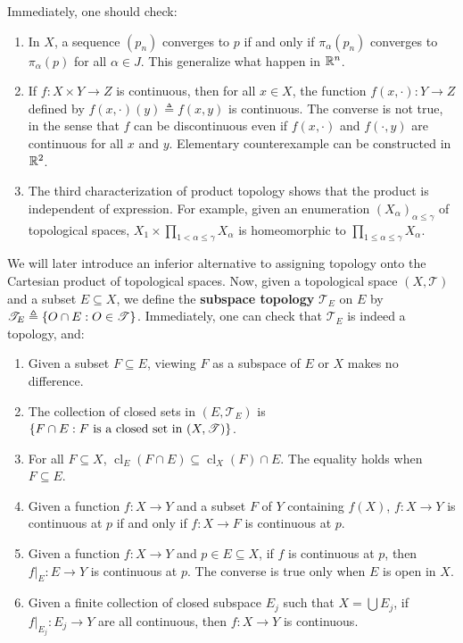 \documentclass{report}
\begin{document}
\begin{mdframed}
Immediately, one should check:
\begin{enumerate}[label=(\alph*)]
    \item In $X$, a sequence $(p_n)$ converges to $p$ if and only if $\pi_\alpha(p_n)$ converges to $\pi_\alpha(p)$ for all $\alpha \in J$. This generalize what happen in $\mathbb{R}^n$. 
    \item If $f : X \times Y \to Z$ is continuous, then for all $x \in X$, the function $f(x,\cdot) : Y \to Z$ defined by $f(x,\cdot)(y) \triangleq f(x, y)$ is continuous. The converse is not true, in the sense that $f$ can be discontinuous even if $f(x,\cdot)$ and $f(\cdot, y)$ are continuous for all $x$ and $y$. Elementary
counterexample can be constructed in $\mathbb{R}^2$.
    \item The third characterization of product topology shows that the product is independent of expression. For example, given an enumeration $(X_\alpha)_{\alpha \leq \gamma}$ of topological spaces, $X_1 \times \prod_{1 < \alpha \leq \gamma} X_\alpha$ is homeomorphic to $\prod_{1 \leq \alpha \leq \gamma} X_\alpha$.
\end{enumerate}
We will later introduce an inferior alternative to assigning topology onto the Cartesian product of topological spaces. Now, given a topological space $(X, \mathscr{T})$ and a subset $E \subseteq X$, we define the \textbf{subspace topology} $\mathscr{T}_E$ on $E$ by $\mathscr{T}_E \triangleq \{ O \cap E : O \in \mathscr{T} \}$. Immediately, one can check that $\mathscr{T}_E$ is indeed a topology, and:
\begin{enumerate}[label=(\alph*)]
    \item Given a subset $F \subseteq E$, viewing $F$ as a subspace of $E$ or $X$ makes no difference.
    \item The collection of closed sets in $(E, \mathscr{T}_E)$ is $\{ F \cap E : F \text{ is a closed set in } (X, \mathscr{T}) \}$.
    \item For all $F \subseteq X$, $\operatorname{cl}_E(F \cap E) \subseteq \operatorname{cl}_X(F) \cap E$. The equality holds when $F \subseteq E$.
  \item Given a function $f : X \to Y$ and a subset $F$ of $Y$ containing $f(X)$, $f : X \to Y$ is continuous at $p$ if and only if $f : X \to F$ is continuous at $p$.
    \item Given a function $f : X \to Y$ and $p \in E \subseteq X$, if $f$ is continuous at $p$, then $f|_E : E \to Y$ is continuous at $p$. The converse is true only when $E$ is open in $X$.
  \item Given a finite collection of closed subspace $E_j$ such that  $X=\bigcup E_j$, if $f|_{E_j}:E_j\rightarrow Y$ are all continuous, then $f:X\rightarrow Y$ is continuous.
\end{enumerate}
\end{mdframed}
\end{document}
